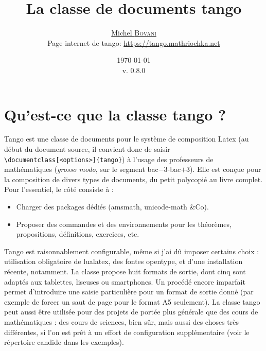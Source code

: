 \documentclass[french,ColorTheme=USAF,FontSize=10pt]{tango}
\newcommand\TO[1]{\textsf{#1}}
\begin{document}
\renewcommand{\arraystretch}{1.1}
\title{\textcolor{ColorOne}{\floweroneleft}\,La classe de documents tango\,\textcolor{ColorOne}{\floweroneright}}
\author{\href{mailto:michel.bovani@icloud.com}{Michel \textsc{Bovani}}\\
Page internet de tango: \href{https://tango.mathriochka.net}{https://tango.mathriochka.net}}
\date{\today\\v. 0.8.0}
{\sffamily
\maketitle

}
\thispagestyle{empty}

\tgoshorttoc
\section{Qu'est-ce que la classe tango ?}


Tango est une classe de documents pour le système de composition Latex (au début du document source, il convient donc de saisir \verb=\documentclass[<options>]{tango}=) à l'usage des professeurs de mathématiques (\emph{grosso modo}, sur le segment bac$-3$-bac$+3$). Elle est conçue pour la composition de divers types de documents, du petit polycopié au livre complet. Pour l'essentiel, le côté  consiste à :
\begin{itemize}
\item Charger des packages dédiés (amsmath, unicode-math \&Co).
\item Proposer des commandes et des environnements pour les théorèmes, propositions, définitions, exercices, etc.
\end{itemize}

Tango est raisonnablement configurable, même si j'ai dû imposer certains choix : utilisation obligatoire de lualatex, des fontes opentype, et d'une installation récente, notamment. La classe propose huit formats de sortie, dont cinq sont adaptés aux tablettes, liseuses ou smartphones. Un procédé encore imparfait permet d'introduire une saisie particulière pour un format de sortie donné (par exemple de forcer un saut de page pour le format A5 seulement). La classe tango peut aussi être utilisée pour des projets de portée plus générale que des cours de mathématiques : des cours de sciences, bien sûr, mais aussi des choses très différentes, si l'on est prêt à un effort de configuration supplémentaire (voir le répertoire \TO{candide} dans les exemples).
\end{document}
